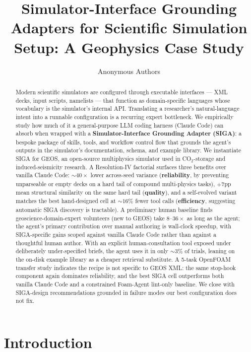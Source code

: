 \documentclass{article}
\title{Simulator-Interface Grounding Adapters for Scientific Simulation Setup: A Geophysics Case Study}
\author{%
  Anonymous Authors\\
}
\begin{document}
\maketitle


\begin{abstract}
Modern scientific simulators are configured through executable interfaces --- XML decks, input scripts, namelists --- that function as domain-specific languages whose vocabulary is the simulator's internal API. Translating a researcher's natural-language intent into a runnable configuration is a recurring expert bottleneck. We empirically study how much of it a general-purpose LLM coding harness (Claude Code) can absorb when wrapped with a \textbf{Simulator-Interface Grounding Adapter (SIGA)}: a bespoke package of skills, tools, and workflow control flow that grounds the agent's outputs in the simulator's documentation, schema, and example library. We instantiate SIGA for GEOS, an open-source multiphysics simulator used in CO$_2$-storage and induced-seismicity research. A Resolution-IV factorial surfaces three benefits over vanilla Claude Code: ${\sim}40{\times}$ lower across-seed variance (\textbf{reliability}, by preventing unparseable or empty decks on a hard tail of compound multi-physics tasks), $+7$pp mean structural similarity on the same hard tail (\textbf{quality}), and a self-evolved variant matches the best hand-designed cell at ${\sim}16\%$ fewer tool calls (\textbf{efficiency}, suggesting automatic SIGA discovery is tractable). A preliminary human baseline finds geoscience-domain-expert volunteers (new to GEOS) take $8\text{--}36\times$ as long as the agent; the agent's primary contribution over manual authoring is wall-clock speedup, with SIGA-specific gains scoped against vanilla Claude Code rather than against a thoughtful human author. With an explicit human-consultation tool exposed under deliberately under-specified briefs, the agent uses it in only ${\sim}3\%$ of trials, leaning on the on-disk example library as a cheaper retrieval substitute. A 5-task OpenFOAM transfer study indicates the recipe is not specific to GEOS XML: the same stop-hook component again dominates reliability, and the best SIGA cell outperforms both vanilla Claude Code and a constrained Foam-Agent lint-only baseline. We close with SIGA-design recommendations grounded in failure modes our best configuration does not fix.
\end{abstract}


\section{Introduction}
\label{sec:intro}
\end{document}
